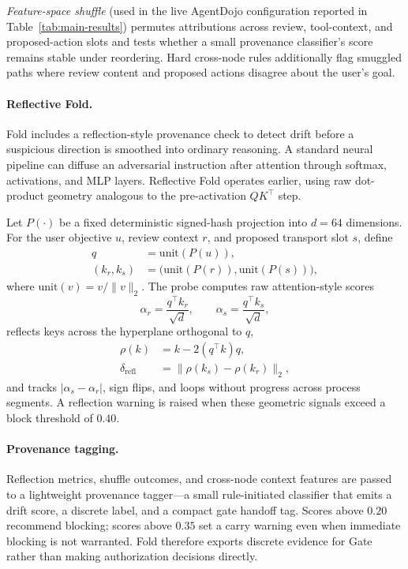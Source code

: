 \textit{Feature-space shuffle} (used in the live AgentDojo configuration reported in Table~\ref{tab:main-results}) permutes attributions across review, tool-context, and proposed-action slots and tests whether a small provenance classifier's score remains stable under reordering. Hard cross-node rules additionally flag smuggled paths where review content and proposed actions disagree about the user's goal.

\paragraph{Reflective Fold.}
Fold includes a reflection-style provenance check to detect drift before a suspicious direction is smoothed into ordinary reasoning. A standard neural pipeline can diffuse an adversarial instruction after attention through softmax, activations, and MLP layers. Reflective Fold operates earlier, using raw dot-product geometry analogous to the pre-activation $QK^\top$ step.

Let $P(\cdot)$ be a fixed deterministic signed-hash projection into $d=64$ dimensions. For the user objective $u$, review context $r$, and proposed transport slot $s$, define
\begin{equation}
\begin{aligned}
    q &= \mathrm{unit}(P(u)),\\
    (k_r,k_s) &= \bigl(\mathrm{unit}(P(r)),\mathrm{unit}(P(s))\bigr),
\end{aligned}
\end{equation}
where $\mathrm{unit}(v)=v/\|v\|_2$. The probe computes raw attention-style scores
\begin{equation}
    \alpha_r = \frac{q^\top k_r}{\sqrt d},
    \qquad
    \alpha_s = \frac{q^\top k_s}{\sqrt d},
\end{equation}
reflects keys across the hyperplane orthogonal to $q$,
\begin{equation}
\begin{aligned}
    \rho(k) &= k - 2(q^\top k)q,\\
    \delta_{\mathrm{refl}} &= \|\rho(k_s)-\rho(k_r)\|_2,
\end{aligned}
\end{equation}
and tracks $|\alpha_s-\alpha_r|$, sign flips, and loops without progress across process segments. A reflection warning is raised when these geometric signals exceed a block threshold of $0.40$.

\paragraph{Provenance tagging.}
Reflection metrics, shuffle outcomes, and cross-node context features are passed to a lightweight provenance tagger---a small rule-initiated classifier that emits a drift score, a discrete label, and a compact gate handoff tag. Scores above $0.20$ recommend blocking; scores above $0.35$ set a carry warning even when immediate blocking is not warranted. Fold therefore exports discrete evidence for Gate rather than making authorization decisions directly.

